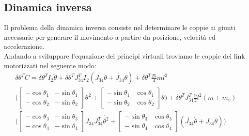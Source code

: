 \subsection{Dinamica inversa}
Il problema della dinamica inversa consiste nel determinare le coppie ai giunti necessarie per generare il movimento a partire da posizione, velocità ed accelerazione.
\\Andando a sviluppare l'equazione dei principi virtuali troviamo le coppie dei link motorizzati nel seguente modo:
\begin{equation*}
\begin{aligned}
    \delta \theta^T C = \delta \theta^T I_2 \ddot{\theta} + \delta \theta^T J_{34}^T I_2(J_{34}\ddot{\theta}+\dot{J_{34}}\dot{\theta})+ \delta \theta^T \frac{25}{4}ml^2\\\bigg(\begin{bmatrix}
    -\cos\theta_1 & -\sin\theta_1 \\ -\cos\theta_2 & -\sin\theta_2
    \end{bmatrix}
    \dot{\theta^2} + \begin{bmatrix}
    -\sin\theta_1 & \cos\theta_1 \\ -\sin\theta_2 & \cos\theta_2
    \end{bmatrix} \ddot{\theta}\bigg) +  \delta \theta^T J_{34}^T\frac{9}{4}l^2(m+m_v)\\\bigg(\begin{bmatrix}
    -\cos\theta_3 & -\sin\theta_3 \\ -\cos\theta_4 & -\sin\theta_4
    \end{bmatrix}J_{34}J_{34}^T\dot{\theta^2}+\begin{bmatrix}
    -\sin\theta_3 & \cos\theta_3 \\ -\sin\theta_4 & \cos\theta_4
    \end{bmatrix}(\dot{J_{34}}\dot{\theta}+J_{34}\ddot{\theta})\bigg)
    \end{aligned}
\end{equation*}

